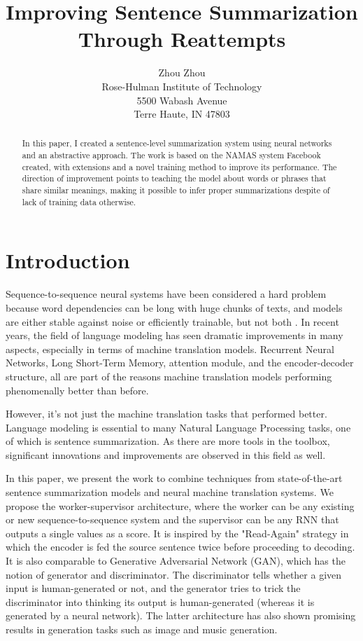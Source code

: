 \documentclass[letterpaper]{article} %
\begin{document}
%
\title{Improving Sentence Summarization Through Reattempts}
\author{Zhou Zhou\\
Rose-Hulman Institute of Technology\\
5500 Wabash Avenue\\
Terre Haute, IN 47803\\
}
\maketitle
\begin{abstract}
In this paper, I created a sentence-level summarization system using neural networks and an abstractive approach. The work is based on the NAMAS system Facebook created, with extensions and a novel training method to improve its performance. The direction of improvement points to teaching the model about words or phrases that share similar meanings, making it possible to infer proper summarizations despite of lack of training data otherwise.
\end{abstract}

\section{Introduction}
Sequence-to-sequence neural systems have been considered a hard problem because word dependencies can be long with huge chunks of texts, and models are either stable against noise or efficiently trainable, but not both \cite{bengio1994learning}. In recent years, the field of language modeling has seen dramatic improvements in many aspects, especially in terms of machine translation models. Recurrent Neural Networks, Long Short-Term Memory, attention module, and the encoder-decoder structure, all are part of the reasons machine translation models performing phenomenally better than before.

However, it’s not just the machine translation tasks that performed better. Language modeling is essential to many Natural Language Processing tasks, one of which is sentence summarization. As there are more tools in the toolbox, significant innovations and improvements are observed in this field as well.

In this paper, we present the work to combine techniques from state-of-the-art sentence summarization models and neural machine translation systems. We propose the worker-supervisor architecture, where the worker can be any existing or new sequence-to-sequence system and the supervisor can be any RNN that outputs a single values as a score. It is inspired by the "Read-Again" strategy in which the encoder is fed the source sentence twice before proceeding to decoding. It is also comparable to Generative Adversarial Network (GAN), which has the notion of generator and discriminator. The discriminator tells whether a given input is human-generated or not, and the generator tries to trick the discriminator into thinking its output is human-generated (whereas it is generated by a neural network). The latter architecture has also shown promising results in generation tasks such as image and music generation.
\end{document}
